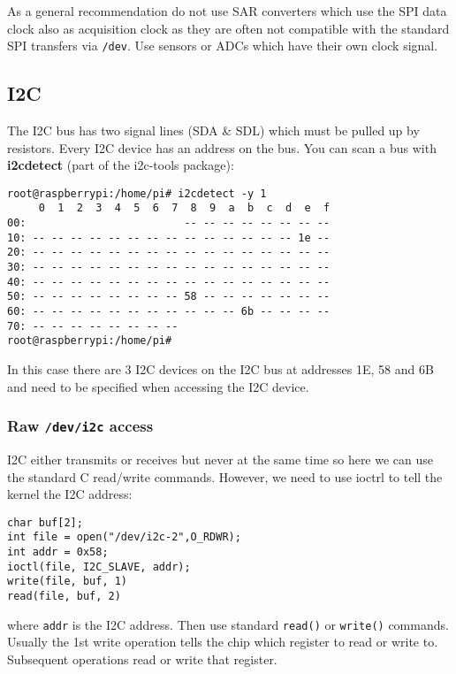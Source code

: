 \documentclass[12pt]{report}
\begin{document}
As a general recommendation do not use SAR converters which use the
SPI data clock also as acquisition clock as they are often not compatible
with the standard SPI transfers via \texttt{/dev}. Use sensors or ADCs which
have their own clock signal.


\subsection{I2C}
The I2C bus has two signal lines (SDA \& SDL) which must be pulled up
by resistors. Every I2C device has an address on the bus. You can scan
a bus with \textbf{i2cdetect} (part of the i2c-tools package):
\begin{verbatim}
root@raspberrypi:/home/pi# i2cdetect -y 1
     0  1  2  3  4  5  6  7  8  9  a  b  c  d  e  f
00:                         -- -- -- -- -- -- -- -- 
10: -- -- -- -- -- -- -- -- -- -- -- -- -- -- 1e -- 
20: -- -- -- -- -- -- -- -- -- -- -- -- -- -- -- -- 
30: -- -- -- -- -- -- -- -- -- -- -- -- -- -- -- -- 
40: -- -- -- -- -- -- -- -- -- -- -- -- -- -- -- -- 
50: -- -- -- -- -- -- -- -- 58 -- -- -- -- -- -- -- 
60: -- -- -- -- -- -- -- -- -- -- -- 6b -- -- -- -- 
70: -- -- -- -- -- -- -- --                         
root@raspberrypi:/home/pi# 
\end{verbatim}
In this case there are 3 I2C devices on the I2C bus at addresses
1E, 58 and 6B and need to be specified when
accessing the I2C device.

\subsubsection{Raw \texttt{/dev/i2c} access}
I2C either transmits or receives but never at the same time so here we
can use the standard C read/write commands. However, we need to use ioctrl to tell
the kernel the I2C address:
\begin{verbatim}
char buf[2];
int file = open("/dev/i2c-2",O_RDWR);
int addr = 0x58;
ioctl(file, I2C_SLAVE, addr);
write(file, buf, 1)
read(file, buf, 2)
\end{verbatim}
where \texttt{addr} is the I2C address. Then use standard \texttt{read()}
or \texttt{write()} commands. Usually the 1st write operation tells the chip
which register to read or write to. Subsequent operations read
or write that register.
\end{document}
